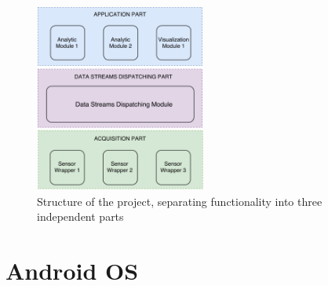 \begin{figure}
    \centering
    \includegraphics[width=0.5\textwidth]{images/parts.png}
    \caption{Structure of the project, separating functionality into three independent parts \cite{daniel}}
    \label{fig:parts}
\end{figure}






\section{Android OS}

